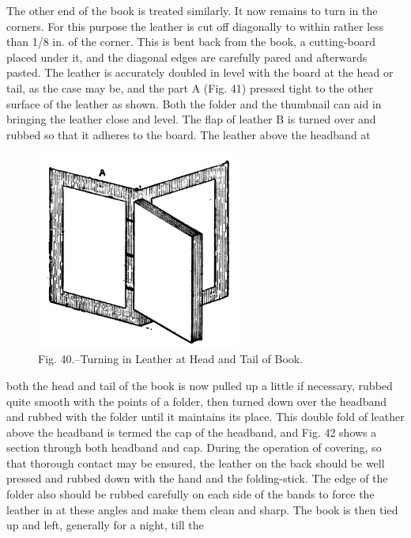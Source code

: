 \documentclass[twoside]{book}
\begin{document}
The other end of the book is treated similarly. It
now remains to turn in the corners. For this purpose
the leather is cut off diagonally to within
\pagebreak
rather less than 1/8 in. of the corner. This is bent
back from the book, a cutting-board placed under it,
and the diagonal edges are carefully pared and
afterwards pasted. The leather is accurately
doubled in level with the board at the head or tail,
as the case may be, and the part A (Fig. 41) pressed
tight to the other surface of the leather as shown.
Both the folder and the thumbnail can aid in bringing
the leather close and level. The flap of leather
B is turned over and rubbed so that it adheres to
the board. The leather above the headband at
	\begin{figure}[h]
		\centering
		\includegraphics[width=0.6\textwidth]{Figures/_040.png}
		\caption*{Fig. 40.--Turning in Leather at Head and Tail of Book.}
	\end{figure}
both the head and tail of the book is now pulled up
a little if necessary, rubbed quite smooth with
the points of a folder, then turned down over the
headband and rubbed with the folder until it maintains
its place. This double fold of leather above
the headband is termed the cap of the headband,
and Fig. 42 shows a section through both headband
and cap. During the operation of covering, so that
thorough contact may be ensured, the leather on the
back should be well pressed and rubbed down with
the hand and the folding-stick. The edge of the
\pagebreak
folder also should be rubbed carefully on each side
of the bands to force the leather in at these angles
and make them clean and sharp. The book is then
tied up and left, generally for a night, till the
\end{document}
